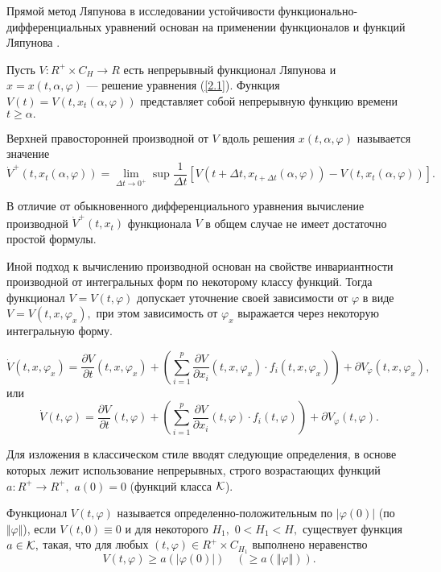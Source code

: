 	Прямой метод Ляпунова в исследовании устойчивости функ\-ци\-о\-наль\-но-диф\-фе\-рен\-ци\-аль\-ных
	уравнений основан на применении функционалов и функций Ляпунова \cite{}.
	
	Пусть $V:R^+\times C_H\to R$ есть непрерывный функционал Ляпунова и
	$x=x(t,\alpha ,\varphi )$ ---
	решение уравнения (\ref{2.1}). Функция $V(t)=V(t,x_t(\alpha
	,\varphi ))$ представляет собой непрерывную функцию времени
	$t\ge\alpha.$
	
	Верхней правосторонней производной от $V$ вдоль решения $x(t,\alpha,\varphi )$
	называется значение \cite{kra591, hei84}
	\begin{equation}\label{der42}
	\dot V^+(t,x_t(\alpha,\varphi ))=\lim\limits_{\Delta t\to
		0^+}\sup\frac1{\Delta t}\left[ V(t+\Delta t,x_{t+\Delta t}(\alpha
	,\varphi ))-V(t,x_t(\alpha,\varphi ))\right].
	\end{equation}
	
	В отличие от обыкновенного дифференциального уравнения вычисление
	производной $\dot V^+(t,x_t)$ функционала $V$ в общем случае не
	имеет достаточно простой формулы.
	
	Иной подход к вычислению производной основан на свойстве
	инвариантности производной от интегральных форм по некоторому
	классу функций. Тогда функционал $V=V(t,\varphi )$
	допускает уточнение своей зависимости
	от $\varphi $ в виде $V=V(t,x,\varphi_x),$ при этом зависимость от
	$\varphi_x$ выражается через некоторую интегральную форму.
	
	\begin{equation*}
	\dot V(t,x,\varphi_{x} )=\frac{\partial V}{\partial t}(t,x,\varphi
	_x)+ \left( \sum\limits_{i=1}^p\frac{\partial V}{\partial
		x_i}(t,x,\varphi _x)\cdot f_i(t,x,\varphi_{x} )\right) +\partial
	V_{\varphi}(t,x,\varphi_x ),
	\end{equation*}
	или
	\begin{equation}\label{1.3}
	\dot V(t,\varphi)=\frac{\partial V}{\partial t}(t,\varphi)+
	\left( \sum\limits_{i=1}^p\frac{\partial V}{\partial
		x_i}(t,\varphi )\cdot f_i(t,\varphi )\right) +\partial
	V_{\varphi}(t,\varphi ).
	\end{equation}

Для изложения в классическом стиле вводят следующие
определения, в основе которых лежит использование непрерывных,
строго возрастающих функций
$a:R^+\to R^+,$ $a(0)=0$ (функций класса $\cal K$).

\begin{definition}\label{d2.9} Функционал $V(t,\varphi )$ называется
	определенно-положительным по $|\varphi(0)|$ (по $\Vert
	\varphi\Vert$), если $V(t,0)\equiv 0$ и для некоторого $H_1,$
	$0<H_1<H,$ существует функция $a\in {\cal K},$ такая, что для
	любых $(t,\varphi) \in R^+\times C_{H_1}$ выполнено неравенство $$
	V(t,\varphi )\ge a(|\varphi (0)|)\quad (\ge a(\Vert \varphi\Vert
	)). $$
\end{definition}

